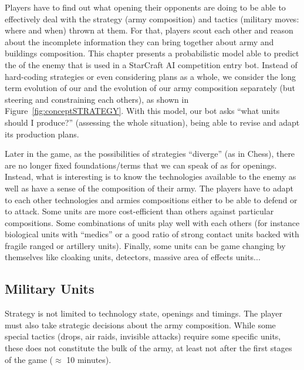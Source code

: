 Players have to find out what opening their opponents are doing to be able to effectively deal with the strategy (army composition) and tactics (military moves: where and when) thrown at them. For that, players scout each other and reason about the incomplete information they can bring together about army and buildings composition. This chapter presents a probabilistic model able to predict the \textit{} of the enemy that is used in a StarCraft AI competition entry bot. Instead of hard-coding strategies or even considering plans as a whole, we consider the long term evolution of our  and the evolution of our army composition separately (but steering and constraining each others), as shown in Figure~\ref{fig:conceptSTRATEGY}. With this model, our bot asks ``what units should I produce?'' (assessing the whole situation), being able to revise and adapt its production plans.

Later in the game, as the possibilities of strategies ``diverge'' (as in Chess), there are no longer fixed foundations/terms that we can speak of as for openings. Instead, what is interesting is to know the technologies available to the enemy as well as have a sense of the composition of their army. The players have to adapt to each other technologies and armies compositions either to be able to defend or to attack. Some units are more cost-efficient than others against particular compositions. Some combinations of units play well with each others (for instance biological units with ``medics'' or a good ratio of strong contact units backed with fragile ranged or artillery units). Finally, some units can be game changing by themselves like cloaking units, detectors, massive area of effects units... 

\subsection{Military Units}
\label{sec:militaryunits}
Strategy is not limited to technology state, openings and timings. The player must also take strategic decisions about the army composition. While some special tactics (drops, air raids, invisible attacks) require some specific units, these does not constitute the bulk of the army, at least not after the first stages of the game ($\approx$ 10 minutes).

